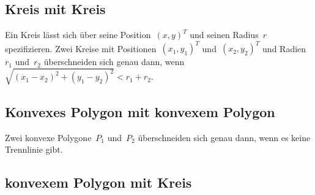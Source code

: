 \documentclass{article}
\begin{document}
\subsection{Kreis mit Kreis}
Ein Kreis lässt sich über seine Position~$(x, y)^{T}$
und seinen Radius~$r$ spezifizieren.
Zwei Kreise mit Positionen~$(x_{1}, y_{1})^{T}$ und~$(x_{2}, y_{2})^{T}$
und Radien~$r_{1}$ und~$r_{2}$ überschneiden sich genau dann,
wenn $\sqrt{(x_{1} - x_{2})^{2} + (y_{1} - y_{2})^{2}} < r_{1} + r_{2}$.

\subsection{Konvexes Polygon mit konvexem Polygon}
Zwei konvexe Polygone~$P_{1}$ und~$P_{2}$ überschneiden sich genau dann,
wenn es keine Trennlinie gibt.

\subsection{konvexem Polygon mit Kreis}


\end{document}

